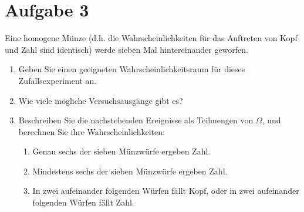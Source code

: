 \documentclass{exercise}
\begin{document}
    \section*{Aufgabe 3}

    \begin{problem}
        Eine homogene Münze (d.h. die Wahrscheinlichkeiten für das Auftreten von Kopf und Zahl sind identisch) werde sieben Mal hintereinander geworfen.
        \begin{enumerate}
            \item Geben Sie einen geeigneten Wahrscheinlichkeitsraum für dieses Zufallsexperiment an.
            \item Wie viele mögliche Versuchsausgänge gibt es?
            \item Beschreiben Sie die nachstehenden Ereignisse als Teilmengen von \(\Omega\), und berechnen Sie ihre Wahrscheinlichkeiten:
            \begin{enumerate}
                \item Genau sechs der sieben Münzwürfe ergeben Zahl.
                \item Mindestens sechs der sieben Münzwürfe ergeben Zahl.
                \item In zwei aufeinander folgenden Würfen fällt Kopf, oder in zwei aufeinander folgenden Würfen fällt Zahl.
            \end{enumerate}
        \end{enumerate}
    \end{problem}
\end{document}
